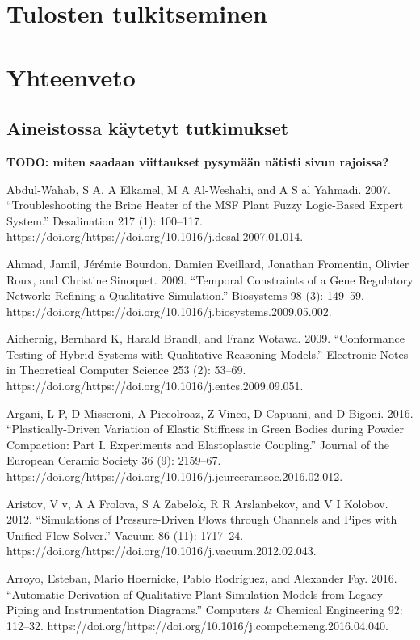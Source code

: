 \documentclass[utf8]{gradu3}
\begin{document}
\chapter{Tulosten tulkitseminen}


\chapter{Yhteenveto}


\printbibliography

\appendix
\section{Aineistossa käytetyt tutkimukset}
\textbf{TODO: miten saadaan viittaukset pysymään nätisti sivun rajoissa?}

Abdul-Wahab, S A, A Elkamel, M A Al-Weshahi, and A S al Yahmadi. 2007. “Troubleshooting the Brine Heater of the MSF Plant Fuzzy Logic-Based Expert System.” Desalination 217 (1): 100–117. https://doi.org/https://doi.org/10.1016/j.desal.2007.01.014.

Ahmad, Jamil, Jérémie Bourdon, Damien Eveillard, Jonathan Fromentin, Olivier Roux, 
and Christine Sinoquet. 2009. 
“Temporal Constraints of a Gene Regulatory Network: 
Refining a Qualitative Simulation.” Biosystems 98 (3): 149–59.
https://doi.org/https://doi.org/10.1016/j.biosystems.2009.05.002.

Aichernig, Bernhard K, Harald Brandl, and Franz Wotawa. 2009. “Conformance Testing of Hybrid Systems with Qualitative Reasoning Models.” Electronic Notes in Theoretical Computer Science 253 (2): 53–69. https://doi.org/https://doi.org/10.1016/j.entcs.2009.09.051.

Argani, L P, D Misseroni, A Piccolroaz, Z Vinco, D Capuani, and D Bigoni. 2016. “Plastically-Driven Variation of Elastic Stiffness in Green Bodies during Powder Compaction: Part I. Experiments and Elastoplastic Coupling.” Journal of the European Ceramic Society 36 (9): 2159–67. https://doi.org/https://doi.org/10.1016/j.jeurceramsoc.2016.02.012.

Aristov, V v, A A Frolova, S A Zabelok, R R Arslanbekov, and V I Kolobov. 2012. “Simulations of Pressure-Driven Flows through Channels and Pipes with Unified Flow Solver.” Vacuum 86 (11): 1717–24. https://doi.org/https://doi.org/10.1016/j.vacuum.2012.02.043.

Arroyo, Esteban, Mario Hoernicke, Pablo Rodríguez, and Alexander Fay. 2016. “Automatic Derivation of Qualitative Plant Simulation Models from Legacy Piping and Instrumentation Diagrams.” Computers \& Chemical Engineering 92: 112–32. https://doi.org/https://doi.org/10.1016/j.compchemeng.2016.04.040.
\end{document}
